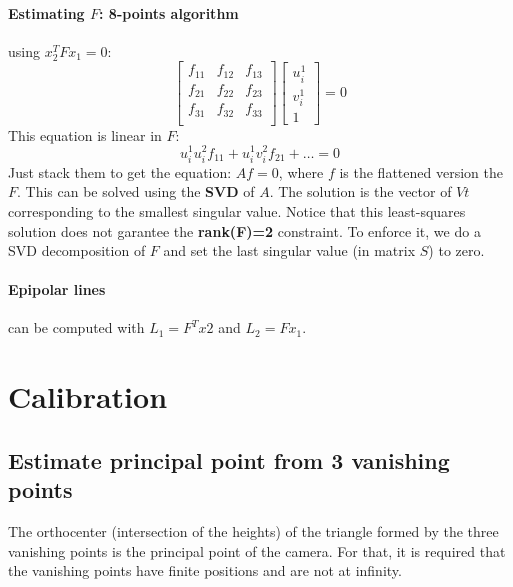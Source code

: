 \paragraph{Estimating $F$: 8-points algorithm} using $x_2^T F x_1=0$:
\begin{equation}
    [u_i^2 v_i^2 1] \left[\begin{array}{ccc}
        f_{11} & f_{12} & f_{13} \\
        f_{21} & f_{22} & f_{23} \\
        f_{31} & f_{32} & f_{33} \\
    \end{array} \right]
    \left[\begin{array}{c}
        u_i^1  \\
        v_i^1 \\
        1
    \end{array}\right] = 0
\end{equation}
This equation is linear in $F$:
\begin{equation}
    u_i^1 u_i^2 f_{11} + u_i^1v_i^2 f_{21} + \dots = 0
\end{equation}
Just stack them to get the equation: $A f = 0$, where $f$ is the flattened version the $F$.
This can be solved using the \textbf{SVD} of $A$. The solution is the vector of $Vt$ corresponding to the smallest singular value.
Notice that this least-squares solution does not garantee the \textbf{rank(F)=2} constraint. To enforce it, we do a SVD decomposition of $F$ and set the last singular value (in matrix $S$) to zero.

\paragraph{Epipolar lines} can be computed with $L_1 = F^T x2$ and $L_2 = F x_1$.



\section{Calibration}
\subsection{Estimate principal point from 3 vanishing points}

The orthocenter (intersection of the heights) of the triangle formed by the three vanishing points is the principal point of the camera. For that, it is required that the vanishing points have finite positions and are not at infinity.



